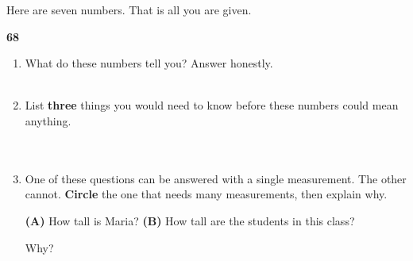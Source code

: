 \documentclass[10pt]{article}
\begin{document}

\vspace{0.15in}

\boxguard[24]
\begin{hookbox}
\small
Here are seven numbers. That is all you are given.

\vspace{8pt}
\begin{center}
{\large\bfseries\color{navy} 68      }
\end{center}
\vspace{4pt}
\end{hookbox}

\vspace{0.16in}

\begin{enumerate}[leftmargin=1.7em, itemsep=0.16in]

  \item What do these numbers tell you? Answer honestly.\\[4pt]
        \writeline\\[1pt]\writeline

  \item List \textbf{three} things you would need to know before these numbers could
        mean anything.\\[4pt]
        \writeline\\[1pt]\writeline\\[1pt]\writeline

  \item One of these questions can be answered with a single measurement. The other
        cannot. \textbf{Circle} the one that needs many measurements, then explain why.
        \vspace{6pt}

        \hspace{1.2em}\textbf{(A)} How tall is Maria?
        \hfill
        \textbf{(B)} How tall are the students in this class?
        \hspace{1.2em}
        \vspace{8pt}

        Why?\\[4pt]
        \writeline\\[1pt]\writeline

\end{enumerate}
\end{document}
